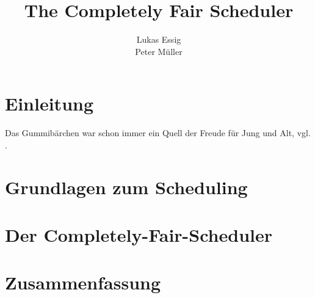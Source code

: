 \documentclass[ngerman]{seminarvorlage}
\begin{document}
\title{The Completely Fair Scheduler}
\author{
  \alignauthor Lukas Essig\\
  \alignauthor Peter Müller\\
}

\maketitle



\section{Einleitung}

Das Gummibärchen war schon immer ein Quell der Freude für Jung
und Alt, vgl. \cite{mingo,mjones}.

\section{Grundlagen zum Scheduling}




\section{Der Completely-Fair-Scheduler}\label{s:cfsmain}




\section{Zusammenfassung}

\pagebreak

%
%


\end{document}
